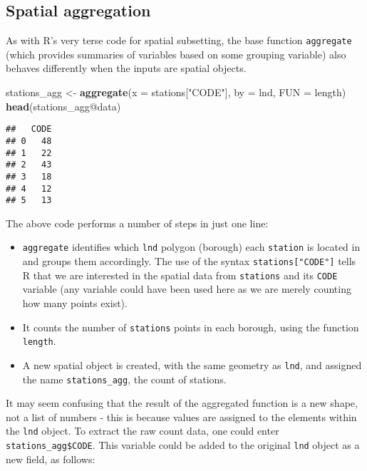 \documentclass[]{article}
\newenvironment{Shaded}{}{}
\newcommand{\KeywordTok}[1]{\textcolor[rgb]{0.00,0.44,0.13}{\textbf{{#1}}}}
\newcommand{\DataTypeTok}[1]{\textcolor[rgb]{0.56,0.13,0.00}{{#1}}}
\newcommand{\StringTok}[1]{\textcolor[rgb]{0.25,0.44,0.63}{{#1}}}
\newcommand{\NormalTok}[1]{{#1}}
\begin{document}
\subsection{Spatial aggregation}\label{spatial-aggregation}

As with R's very terse code for spatial subsetting, the base function
\texttt{aggregate} (which provides summaries of variables based on some
grouping variable) also behaves differently when the inputs are spatial
objects.

\begin{Shaded}
\begin{Highlighting}[]
\NormalTok{stations_agg <-}\StringTok{ }\KeywordTok{aggregate}\NormalTok{(}\DataTypeTok{x =} \NormalTok{stations[}\StringTok{"CODE"}\NormalTok{], }\DataTypeTok{by =} \NormalTok{lnd, }\DataTypeTok{FUN =} \NormalTok{length)}
\KeywordTok{head}\NormalTok{(stations_agg@data)}
\end{Highlighting}
\end{Shaded}

\begin{verbatim}
##   CODE
## 0   48
## 1   22
## 2   43
## 3   18
## 4   12
## 5   13
\end{verbatim}

The above code performs a number of steps in just one line:

\begin{itemize}
\itemsep1pt\parskip0pt
\item
  \texttt{aggregate} identifies which \texttt{lnd} polygon (borough)
  each \texttt{station} is located in and groups them accordingly. The
  use of the syntax \texttt{stations{[}"CODE"{]}} tells R that we are
  interested in the spatial data from \texttt{stations} and its
  \texttt{CODE} variable (any variable could have been used here as we
  are merely counting how many points exist).
\item
  It counts the number of \texttt{stations} points in each borough,
  using the function \texttt{length}.
\item
  A new spatial object is created, with the same geometry as
  \texttt{lnd}, and assigned the name \texttt{stations\_agg}, the count
  of stations.
\end{itemize}

It may seem confusing that the result of the aggregated function is a
new shape, not a list of numbers - this is because values are assigned
to the elements within the \texttt{lnd} object. To extract the raw count
data, one could enter \texttt{stations\_agg\$CODE}. This variable could
be added to the original \texttt{lnd} object as a new field, as follows:
\end{document}

